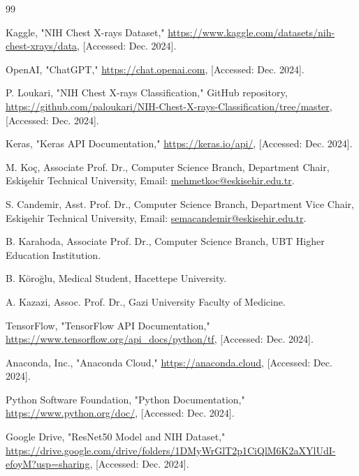 \documentclass[journal]{IEEEtran}
\begin{document}
\begin{thebibliography}{99}

Kaggle, "NIH Chest X-rays Dataset," \url{https://www.kaggle.com/datasets/nih-chest-xrays/data}, [Accessed: Dec. 2024].

OpenAI, "ChatGPT," \url{https://chat.openai.com}, [Accessed: Dec. 2024].

P. Loukari, "NIH Chest X-rays Classification," GitHub repository, \url{https://github.com/paloukari/NIH-Chest-X-rays-Classification/tree/master}, [Accessed: Dec. 2024].

Keras, "Keras API Documentation," \url{https://keras.io/api/}, [Accessed: Dec. 2024].

M. Koç, Associate Prof. Dr., Computer Science Branch, Department Chair, Eskişehir Technical University, Email: \url{mehmetkoc@eskisehir.edu.tr}.

S. Candemir, Asst. Prof. Dr., Computer Science Branch, Department Vice Chair, Eskişehir Technical University, Email: \url{semacandemir@eskisehir.edu.tr}.

B. Karahoda, Associate Prof. Dr., Computer Science Branch, UBT Higher Education Institution.

B. Köroğlu, Medical Student, Hacettepe University.

A. Kazazi, Assoc. Prof. Dr., Gazi University Faculty of Medicine.

TensorFlow, "TensorFlow API Documentation," \url{https://www.tensorflow.org/api_docs/python/tf}, [Accessed: Dec. 2024].

Anaconda, Inc., "Anaconda Cloud," \url{https://anaconda.cloud}, [Accessed: Dec. 2024].

Python Software Foundation, "Python Documentation," \url{https://www.python.org/doc/}, [Accessed: Dec. 2024].

Google Drive, "ResNet50 Model and NIH Dataset," \url{https://drive.google.com/drive/folders/1DMyWrGlT2p1CiQlM6K2aXYlUdI-efoyM?usp=sharing}, [Accessed: Dec. 2024].


\end{thebibliography}
\end{document}
